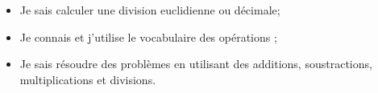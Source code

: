 \begin{myobj}
	\begin{itemize}
		\item Je sais calculer une division euclidienne ou décimale;
		\item Je connais et j'utilise le vocabulaire des opérations ;
		\item Je sais résoudre des problèmes en utilisant des additions, soustractions, multiplications et divisions.
		
	\end{itemize}
\end{myobj}

%			
%		
